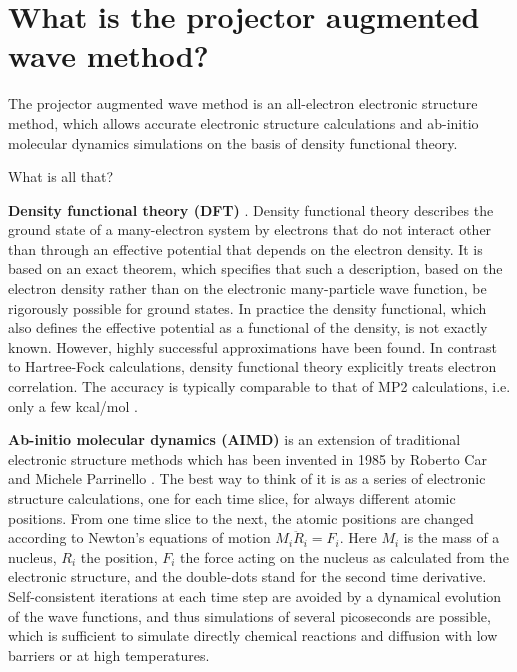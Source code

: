 \documentclass[final,12pt]{article}
\begin{document}
\section{What is the projector augmented wave method?}

The projector augmented wave method \cite{bloechl94_prb50_17953} is an
all-electron electronic structure method, which allows accurate electronic
structure calculations and ab-initio molecular dynamics simulations on the
basis of density functional theory.

What is all that?

{\bf Density functional theory (DFT)}
\cite{hohenberg64_pr136_864,kohn65_pr140_1133}. Density functional
theory describes the ground state of a many-electron system by electrons that
do not interact other than through an effective potential that depends on the
electron density. It is based on an exact theorem, which specifies that such a
description, based on the electron density rather than on the electronic
many-particle wave function, be rigorously possible for ground states. In
practice the density functional, which also defines the effective potential as
a functional of the density, is not exactly known. However, highly successful
approximations have been found. In contrast to Hartree-Fock calculations,
density functional theory explicitly treats electron correlation. The accuracy
is typically comparable to that of MP2 calculations, i.e. only a few kcal/mol
\cite{becke92_jcp97_9173,dickson93_jcp99_3898}.

{\bf Ab-initio molecular dynamics (AIMD)}
\cite{car85_prl55_2471,car89_bookchapter_455,pastore91_pra44_6334} is an
extension of traditional electronic structure methods which has been invented
in 1985 by Roberto Car and Michele Parrinello \cite{car85_prl55_2471}.  The
best way to think of it is as a series of electronic structure calculations,
one for each time slice, for always different atomic positions. From one time
slice to the next, the atomic positions are changed according to Newton's
equations of motion $M_i\ddot R_i=F_i$.  Here $M_i$ is the mass of a nucleus,
$R_i$ the position, $F_i$ the force acting on the nucleus as calculated from
the electronic structure, and the double-dots stand for the second time
derivative.  Self-consistent iterations at each time step are avoided by a
dynamical evolution of the wave functions, and thus simulations of several
picoseconds are possible, which is sufficient to simulate directly chemical
reactions and diffusion with low barriers or at high temperatures.
\end{document}
